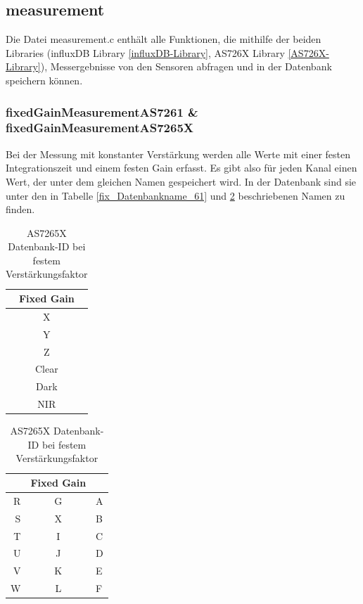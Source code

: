 \subsection{measurement}\label{measurement-c}
Die Datei measurement.c enthält alle Funktionen, die mithilfe der beiden Libraries (influxDB Library \ref{influxDB-Library}, AS726X Library \ref{AS726X-Library}), Messergebnisse von den Sensoren abfragen und in der Datenbank speichern können.


\subsubsection{fixedGainMeasurementAS7261 \& fixedGainMeasurementAS7265X}
Bei der Messung mit konstanter Verstärkung werden alle Werte mit einer festen Integrationszeit und einem festen Gain erfasst. Es gibt also für jeden Kanal einen Wert, der unter dem gleichen Namen gespeichert wird. In der Datenbank sind sie unter den in Tabelle \ref{fix_Datenbankname_61} und \ref{fix_Datenbankname_65} beschriebenen Namen zu finden.

\begin{table}[H]
\parbox{.45\linewidth}{
\centering
\begin{tabular}{ c }
Fixed Gain \\
\hline
X \\ 
Y  \\
Z  \\
Clear \\ 
Dark \\ 
NIR \\ 
\end{tabular}
\caption{AS7261 Datenbank-ID bei festem Verstärkungsfaktor}
\label{fix_Datenbankname_61}

}
\hfill
\parbox{.45\linewidth}{
\centering
\begin{tabular}{ r c l}
&Fixed Gain \\
\hline
 	R & G & A \\  
 	S & X & B \\
 	T & I & C \\  
 	U & J & D \\
 	V & K & E \\  
 	W & L & F \\

\end{tabular}
\caption{AS7265X Datenbank-ID bei festem Verstärkungsfaktor}
\label{fix_Datenbankname_65}
}
\end{table}




